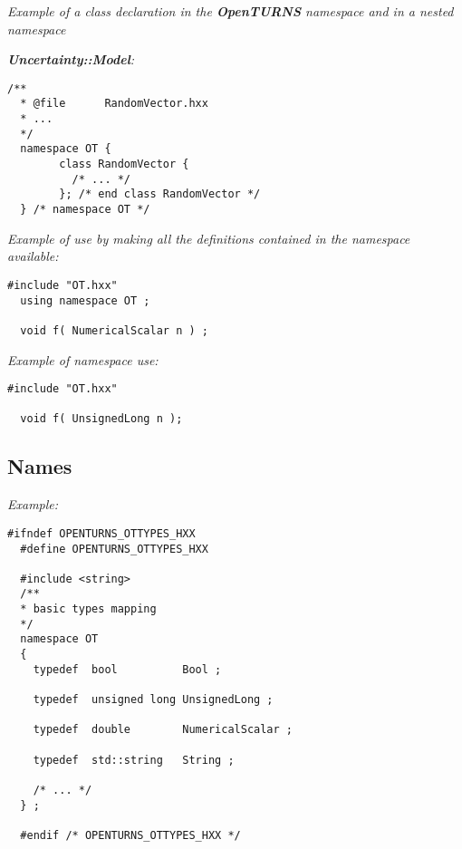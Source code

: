 \emph{Example of a class declaration in the {\bf OpenTURNS} namespace and in a nested namespace}

\emph{{\bf Uncertainty::Model}:}
\lstset{language=C++, basicstyle=\normalsize}
\begin{lstlisting}[frame=TBRL]
  /**
  * @file      RandomVector.hxx
  * ...
  */
  namespace OT {
        class RandomVector {
          /* ... */
        }; /* end class RandomVector */
  } /* namespace OT */
\end{lstlisting}

\emph{Example of use by making all the definitions contained in the namespace available:}
\lstset{language=C++, basicstyle=\normalsize}
\begin{lstlisting}[frame=TBRL]
  #include "OT.hxx"
  using namespace OT ;

  void f( NumericalScalar n ) ;
\end{lstlisting}


\emph{Example of namespace use:}
\lstset{language=C++, basicstyle=\normalsize}
\begin{lstlisting}[frame=TBRL]
  #include "OT.hxx"

  void f( UnsignedLong n );
\end{lstlisting}

\subsection{Names}

\emph{Example:}
\lstset{language=C++, basicstyle=\normalsize}
\begin{lstlisting}[frame=TBRL]
  #ifndef OPENTURNS_OTTYPES_HXX
  #define OPENTURNS_OTTYPES_HXX

  #include <string>
  /**
  * basic types mapping
  */
  namespace OT
  {
    typedef  bool          Bool ;

    typedef  unsigned long UnsignedLong ;

    typedef  double        NumericalScalar ;

    typedef  std::string   String ;

    /* ... */
  } ;

  #endif /* OPENTURNS_OTTYPES_HXX */
\end{lstlisting}

